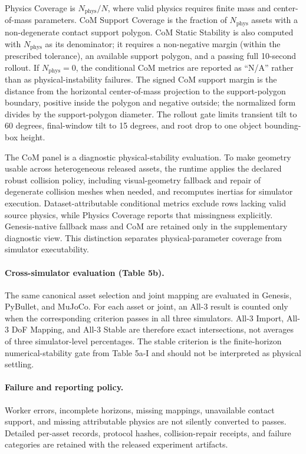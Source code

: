 Physics Coverage is $N_{\mathrm{phys}}/N$, where valid physics requires finite
mass and center-of-mass parameters. CoM Support Coverage is the fraction of
$N_{\mathrm{phys}}$ assets with a non-degenerate contact support polygon. CoM
Static Stability is also computed with $N_{\mathrm{phys}}$ as its denominator;
it requires a non-negative margin (within the prescribed tolerance), an
available support polygon, and a passing full 10-second rollout. If
$N_{\mathrm{phys}}=0$, the conditional CoM metrics are reported as ``N/A''
rather than as physical-instability failures. The signed CoM support margin is
the distance from the horizontal center-of-mass projection to the
support-polygon boundary, positive inside the polygon and negative outside;
the normalized form divides by the support-polygon diameter. The rollout gate
limits transient tilt to 60 degrees, final-window tilt to 15 degrees, and root
drop to one object bounding-box height.

The CoM panel is a diagnostic physical-stability evaluation. To make geometry
usable across heterogeneous released assets, the runtime applies the declared
robust collision policy, including visual-geometry fallback and repair of
degenerate collision meshes when needed, and recomputes inertias for simulator
execution. Dataset-attributable conditional metrics exclude rows lacking valid
source physics, while Physics Coverage reports that missingness explicitly.
Genesis-native fallback mass and CoM are retained only in the supplementary
diagnostic view. This distinction separates physical-parameter coverage from
simulator executability.

\paragraph{Cross-simulator evaluation (Table 5b).}
The same canonical asset selection and joint mapping are evaluated in Genesis,
PyBullet, and MuJoCo. For each asset or joint, an All-3 result is counted only
when the corresponding criterion passes in all three simulators. All-3 Import,
All-3 DoF Mapping, and All-3 Stable are therefore exact intersections, not
averages of three simulator-level percentages. The stable criterion is the
finite-horizon numerical-stability gate from Table 5a-I and should not be
interpreted as physical settling.

\paragraph{Failure and reporting policy.}
Worker errors, incomplete horizons, missing mappings, unavailable contact
support, and missing attributable physics are not silently converted to
passes. Detailed per-asset records, protocol hashes, collision-repair receipts,
and failure categories are retained with the released experiment artifacts.
